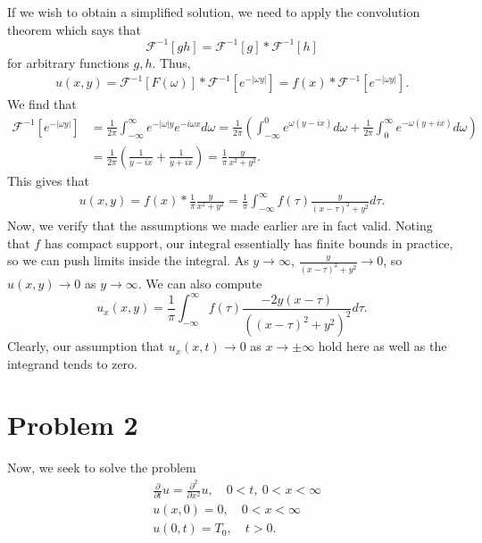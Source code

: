 \documentclass{article}
\begin{document}
If we wish to obtain a simplified solution, we need to apply the convolution theorem which says that 
\[
\mathcal{F}^{-1}[gh]=\mathcal{F}^{-1}[g]*\mathcal{F}^{-1}[h]
\]
for arbitrary functions $g,h$. Thus,
\begin{align*}
u(x,y)=\mathcal{F}^{-1}[F(\omega)]*\mathcal{F}^{-1}[e^{-|\omega y|}]=f(x)*\mathcal{F}^{-1}[e^{-|\omega y|}].
\end{align*}
We find that 
\begin{align*}
\mathcal{F}^{-1}[e^{-|\omega y|}]&=\frac{1}{2\pi}\int_{-\infty}^\infty e^{-|\omega|y}e^{-i\omega x}d\omega=\frac{1}{2\pi}\left(\int_{-\infty}^0 e^{\omega(y-ix)}d\omega+\frac{1}{2\pi}\int_{0}^\infty e^{-\omega(y+ix)}d\omega\right)\\&=
\frac{1}{2\pi}\left(\frac{1}{y-ix}+\frac{1}{y+ix}\right)=\frac{1}{\pi}\frac{y}{x^2+y^2}.
\end{align*}
This gives that 
\begin{align*}
u(x,y)=f(x)*\frac{1}{\pi}\frac{y}{x^2+y^2}=\frac{1}{\pi}\int_{-\infty}^{\infty}f(\tau)\frac{y}{(x-\tau)^2+y^2}d\tau.
\end{align*}
Now, we verify that the assumptions we made earlier are in fact valid. Noting that $f$ has compact support, our integral essentially has finite bounds in practice, so we can push limits inside the integral. As $y\to\infty$, $\frac{y}{(x-\tau)^2+y^2}\to0$, so $u(x,y)\to0$ as $y\to\infty$. We can also compute
\[
u_x(x,y)=\frac{1}{\pi}\int_{-\infty}^{\infty}f(\tau)\frac{-2y(x-\tau)}{((x-\tau)^2+y^2)^2}d\tau.
\]
Clearly, our assumption that $u_x(x,t)\to0$ as $x\to\pm\infty$ hold here as well as the integrand tends to zero.


\section{Problem 2}
Now, we seek to solve the problem 
\begin{align*}
&\frac{\partial}{\partial t}u=\frac{\partial^2}{\partial x^2}u, \quad 0<t,~0<x<\infty\\
&u(x,0)=0, \quad 0<x<\infty\\
&u(0,t)=T_0, \quad t>0.
\end{align*}
\end{document}
